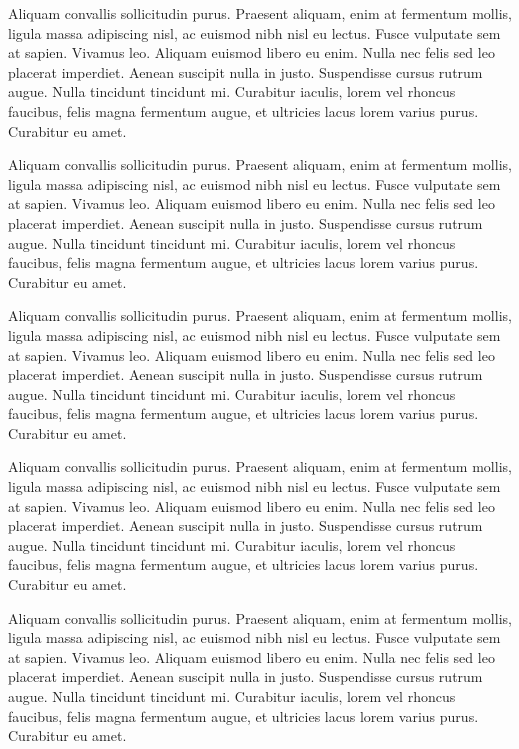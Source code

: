 Aliquam convallis sollicitudin purus. Praesent aliquam, enim at fermentum mollis, ligula massa adipiscing nisl, ac euismod nibh nisl eu lectus. Fusce vulputate sem at sapien. Vivamus leo. Aliquam euismod libero eu enim. Nulla nec felis sed leo placerat imperdiet. Aenean suscipit nulla in justo. Suspendisse cursus rutrum augue. Nulla tincidunt tincidunt mi. Curabitur iaculis, lorem vel rhoncus faucibus, felis magna fermentum augue, et ultricies lacus lorem varius purus. Curabitur eu amet.

Aliquam convallis sollicitudin purus. Praesent aliquam, enim at fermentum mollis, ligula massa adipiscing nisl, ac euismod nibh nisl eu lectus. Fusce vulputate sem at sapien. Vivamus leo. Aliquam euismod libero eu enim. Nulla nec felis sed leo placerat imperdiet. Aenean suscipit nulla in justo. Suspendisse cursus rutrum augue. Nulla tincidunt tincidunt mi. Curabitur iaculis, lorem vel rhoncus faucibus, felis magna fermentum augue, et ultricies lacus lorem varius purus. Curabitur eu amet.

Aliquam convallis sollicitudin purus. Praesent aliquam, enim at fermentum mollis, ligula massa adipiscing nisl, ac euismod nibh nisl eu lectus. Fusce vulputate sem at sapien. Vivamus leo. Aliquam euismod libero eu enim. Nulla nec felis sed leo placerat imperdiet. Aenean suscipit nulla in justo. Suspendisse cursus rutrum augue. Nulla tincidunt tincidunt mi. Curabitur iaculis, lorem vel rhoncus faucibus, felis magna fermentum augue, et ultricies lacus lorem varius purus. Curabitur eu amet.

Aliquam convallis sollicitudin purus. Praesent aliquam, enim at fermentum mollis, ligula massa adipiscing nisl, ac euismod nibh nisl eu lectus. Fusce vulputate sem at sapien. Vivamus leo. Aliquam euismod libero eu enim. Nulla nec felis sed leo placerat imperdiet. Aenean suscipit nulla in justo. Suspendisse cursus rutrum augue. Nulla tincidunt tincidunt mi. Curabitur iaculis, lorem vel rhoncus faucibus, felis magna fermentum augue, et ultricies lacus lorem varius purus. Curabitur eu amet.

Aliquam convallis sollicitudin purus. Praesent aliquam, enim at fermentum mollis, ligula massa adipiscing nisl, ac euismod nibh nisl eu lectus. Fusce vulputate sem at sapien. Vivamus leo. Aliquam euismod libero eu enim. Nulla nec felis sed leo placerat imperdiet. Aenean suscipit nulla in justo. Suspendisse cursus rutrum augue. Nulla tincidunt tincidunt mi. Curabitur iaculis, lorem vel rhoncus faucibus, felis magna fermentum augue, et ultricies lacus lorem varius purus. Curabitur eu amet.

